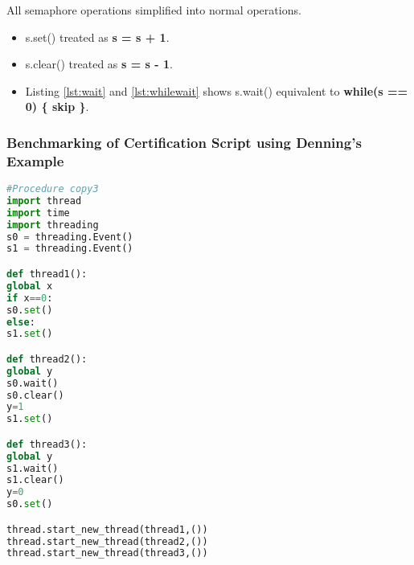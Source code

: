 All semaphore operations simplified into normal operations.
\begin{itemize}
	\item s.set() treated as \textbf{s = s + 1}.
	\item s.clear() treated as \textbf{s = s - 1}.
	\item Listing \ref{lst:wait} and \ref{lst:whilewait} shows s.wait() equivalent to \textbf{while(s == 0) \{ skip \}}.
\end{itemize}
\subsubsection{Benchmarking of Certification Script using Denning's Example \cite{denning}}
\begin{lstlisting}[language=Python, caption=Python version of copy3 example in \cite{denning}. goal: information flow from x to y, label={lst:copy3} ]
#Procedure copy3
import thread
import time
import threading
s0 = threading.Event()
s1 = threading.Event()

def thread1():
global x
if x==0:
s0.set()
else:
s1.set()

def thread2():
global y
s0.wait()
s0.clear()
y=1
s1.set()

def thread3():
global y
s1.wait()
s1.clear()
y=0
s0.set()

thread.start_new_thread(thread1,())
thread.start_new_thread(thread2,())
thread.start_new_thread(thread3,())
\end{lstlisting}

